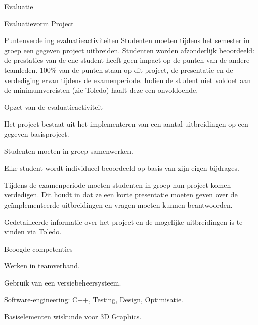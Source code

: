 \documentclass{studiewijzer}
\begin{document}
\begin{categorybox}{Evaluatie}
    \begin{category}{Evaluatievorm}
        Project
    \end{category}

    \begin{category}{Puntenverdeling evaluatieactiviteiten}
        Studenten moeten tijdens het semester in groep een gegeven project uitbreiden.
        Studenten worden afzonderlijk beoordeeld: de prestaties van de ene student heeft geen impact op de punten van de andere teamleden.
        100\% van de punten staan op dit project, de presentatie en de verdediging ervan tijdens de examenperiode.
        Indien de student niet voldoet aan de minimumvereisten (zie Toledo) haalt deze een onvoldoende.
    \end{category}

    \begin{category}{Opzet van de evaluatieactiviteit}
        \begin{items}
            \item Het project bestaat uit het implementeren van een aantal uitbreidingen op een gegeven basisproject.
            \item Studenten moeten in groep samenwerken.
            \item Elke student wordt individueel beoordeeld op basis van zijn eigen bijdrages.
            \item Tijdens de examenperiode moeten studenten in groep hun project komen verdedigen. Dit houdt in dat ze een korte presentatie moeten geven over de geïmplementeerde uitbreidingen en vragen moeten kunnen beantwoorden.
            \item Gedetailleerde informatie over het project en de mogelijke uitbreidingen is te vinden via Toledo.
        \end{items}
    \end{category}

    \begin{category}{Beoogde competenties}
        \begin{items}
            \item Werken in teamverband.
            \item Gebruik van een versiebeheersysteem.
            \item Software-engineering: C++, Testing, Design, Optimisatie.
            \item Basiselementen wiskunde voor 3D Graphics.
        \end{items}
    \end{category}


\end{categorybox}
\end{document}
